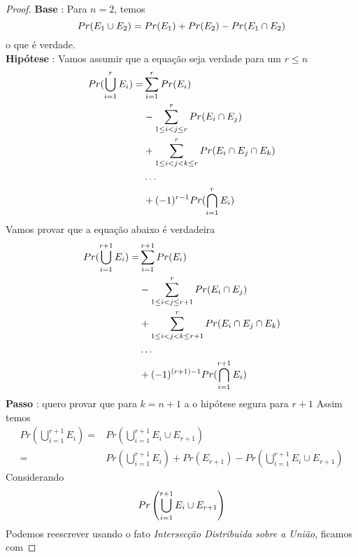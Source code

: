 \documentclass{article}
\begin{document}
\begin{proof}
    \hfill \break
    \textbf{Base} : Para $n = 2$, temos
    \begin{equation}
    \notag
        Pr(E_1 \cup E_2) = Pr(E_1) + Pr(E_2)- Pr(E_1 \cap E_2)
    \end{equation}
    \hspace*{30pt} o que é verdade.\\

    \textbf{Hipótese} : Vamos assumir que a equação seja verdade para um $r \leq n$
    \begin{equation}
    \notag
        \begin{split}
            Pr(\bigcup_{i = 1}^{r}E_i) =& \sum\limits_{i=1}^{r}Pr(E_i)\\
            & -\sum\limits_{1\leq i<j\leq r}^{r}Pr(E_i \cap E_j)\\
            & +\sum\limits_{1\leq i<j<k\leq r}^{r}Pr(E_i \cap E_j \cap E_k)\\
            & \ldots\\
            & +(-1)^{r-1}Pr(\bigcap_{i=1}^{r}E_i)
        \end{split}
    \end{equation}
    Vamos provar que a equação abaixo é verdadeira
    \begin{equation}
    \notag
        \begin{split}
            Pr(\bigcup_{i = 1}^{r+1}E_i) =& \sum\limits_{i=1}^{r+1}Pr(E_i)\\
            & -\sum\limits_{1\leq i<j\leq r+1}^{r}Pr(E_i \cap E_j)\\
            & +\sum\limits_{1\leq i<j<k\leq r+1}^{r}Pr(E_i \cap E_j \cap E_k)\\
            & \ldots\\
            & +(-1)^{(r+1)-1}Pr(\bigcap_{i=1}^{r+1}E_i)
        \end{split}
    \end{equation}
    \textbf{Passo} : quero provar que para $k = n + 1$ a o hipótese segura para $r + 1$
    \hspace*{30pt} Assim temos \newline
    \begin{equation}
    \label{eq:dev}
        \begin{split}
            Pr(\bigcup_{i = 1}^{r+1}E_i) =& Pr(\bigcup_{i = 1}^{r+1}E_i \cup E_{r+1})\\
            =& Pr(\bigcup_{i = 1}^{r+1}E_i) + Pr(E_{r+1}) - Pr(\bigcup_{i = 1}^{r+1}E_i \cup E_{r+1})
        \end{split}
    \end{equation}
    Considerando 
    \begin{equation}
        \notag
        Pr\left(\bigcup_{i = 1}^{r+1}E_i \cup E_{r+1}\right)
    \end{equation}
    Podemos reescrever usando o fato \textit{Intersecção Distribuida sobre a União}, ficamos com


\end{proof}
\end{document}
